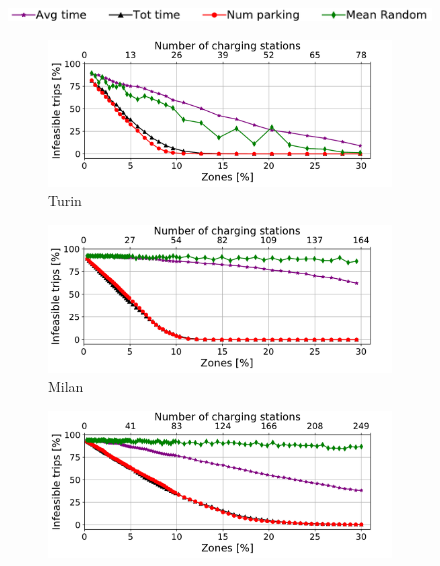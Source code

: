 \begin{figure}[t!]
	\begin{center}
		\includegraphics[width=\textwidth]{figures/legenda2.pdf}
	\end{center}
	\begin{center}
		\begin{subfigure}{0.49\textwidth}
			\includegraphics[width=\columnwidth]{figures/Torino_zonesVsDeaths_algorithms_acs-4_tt-25_policy-FreeFloating.pdf}
			\caption{Turin}
			\label{fig:6_4_zone_vs_deaths_torino}
		\end{subfigure}
		\begin{subfigure}{0.49\textwidth}
			\includegraphics[width=\columnwidth]{figures/Milano_zonesVsDeaths_algorithms_acs-4_tt-25_policy-FreeFloating.pdf}
			\caption{Milan}
			\label{fig:6_4_zone_vs_deaths_milano}
		\end{subfigure}
		\begin{subfigure}{0.49\textwidth}
			\includegraphics[width=\columnwidth]{figures/Berlino_zonesVsDeaths_algorithms_acs-4_tt-25_policy-FreeFloating.pdf}

\end{subfigure}
\end{center}
\end{figure}
